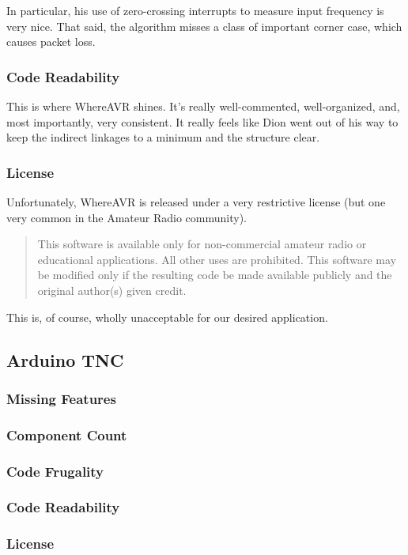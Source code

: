 \documentclass{article}
\begin{document}
In particular, his use of zero-crossing interrupts to measure input
frequency is very nice.  That said, the algorithm misses a class of
important corner case, which causes packet loss.

\subsubsection{Code Readability}

This is where WhereAVR shines.  It's really well-commented,
well-organized, and, most importantly, very consistent.  It really
feels like Dion went out of his way to keep the indirect linkages to a
minimum and the structure clear.


\subsubsection{License}

Unfortunately, WhereAVR is released under a very restrictive license
(but one very common in the Amateur Radio community).
\begin{quote}
  This software is available only for non-commercial amateur radio or
  educational applications.  All other uses are prohibited.  This
  software may be modified only if the resulting code be made
  available publicly and the original author(s) given credit.
\end{quote}

This is, of course, wholly unacceptable for our desired application.

\subsection{Arduino TNC}
\subsubsection{Missing Features}
\subsubsection{Component Count}
\subsubsection{Code Frugality}
\subsubsection{Code Readability}
\subsubsection{License}
\end{document}
